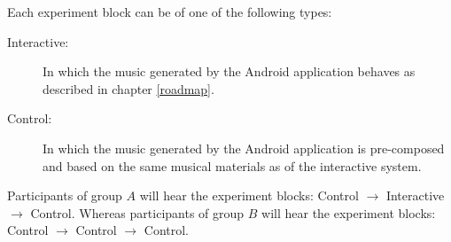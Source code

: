 Each experiment block can be of one of the following types:
\begin{description}
	\item[Interactive:] In which the music generated by the Android application behaves as described in chapter \ref{roadmap}.
	\item[Control:] In which the music generated by the Android application is pre-composed and based on the same musical materials as of the interactive system.
\end{description}

Participants of group $A$ will hear the experiment blocks: Control $\rightarrow$ Interactive $\rightarrow$ Control. Whereas participants of group $B$ will hear the experiment blocks: Control $\rightarrow$ Control $\rightarrow$ Control.
